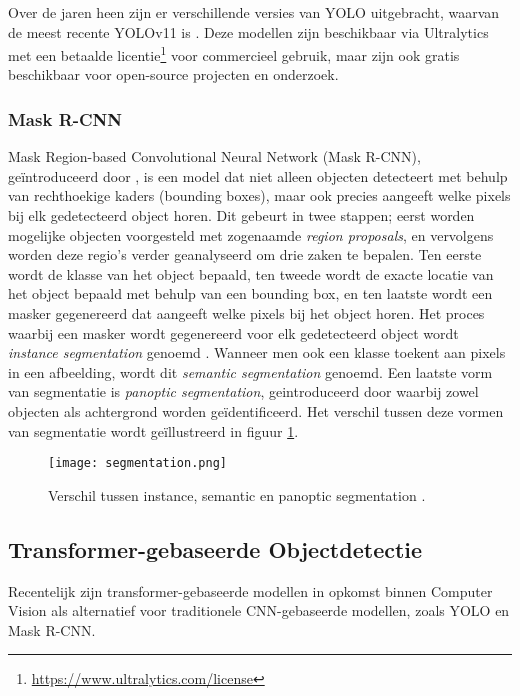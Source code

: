 Over de jaren heen zijn er verschillende versies van YOLO uitgebracht, waarvan de meest recente YOLOv11 is \autocite{Khanam2024}.
Deze modellen zijn beschikbaar via Ultralytics met een betaalde licentie\footnote{\url{https://www.ultralytics.com/license}} voor commercieel gebruik, maar zijn ook gratis beschikbaar voor open-source projecten en onderzoek.

\subsubsection{Mask R-CNN}

Mask Region-based Convolutional Neural Network (Mask R-CNN), geïntroduceerd door \textcite{He2018}, is een model dat niet alleen objecten detecteert met behulp van rechthoekige kaders (bounding boxes), 
maar ook precies aangeeft welke pixels bij elk gedetecteerd object horen. Dit gebeurt in twee stappen; eerst worden mogelijke objecten voorgesteld met zogenaamde \textit{region proposals}, en vervolgens
worden deze regio's verder geanalyseerd om drie zaken te bepalen. Ten eerste wordt de klasse van het object bepaald, ten tweede wordt de exacte locatie van het object bepaald met behulp van een bounding box, en ten laatste
wordt een masker gegenereerd dat aangeeft welke pixels bij het object horen. Het proces waarbij een masker wordt gegenereerd voor elk gedetecteerd object wordt \textit{instance segmentation} genoemd \autocite{Hafiz2020}.
Wanneer men ook een klasse toekent aan pixels in een afbeelding, wordt dit \textit{semantic segmentation} genoemd. Een laatste vorm van segmentatie is \textit{panoptic segmentation}, geintroduceerd door \textcite{Kirillov2019} waarbij zowel objecten als achtergrond worden geïdentificeerd.
Het verschil tussen deze vormen van segmentatie wordt geïllustreerd in figuur \ref{fig:segmentation}.

\begin{figure}[H]
  \centering
  \texttt{[image: segmentation.png]}
  \caption[]{\label{fig:segmentation}
  Verschil tussen instance, semantic en panoptic segmentation \autocite{Kirillov2019}.
  }
\end{figure}

\subsection{Transformer-gebaseerde Objectdetectie}

Recentelijk zijn transformer-gebaseerde modellen in opkomst binnen Computer Vision als alternatief voor traditionele CNN-gebaseerde modellen, zoals YOLO en Mask R-CNN. 

